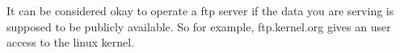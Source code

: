 It can be considered okay to operate a ftp server if the data you are serving is supposed to be publicly available. So for example, ftp.kernel.org gives an user access to the linux kernel. 